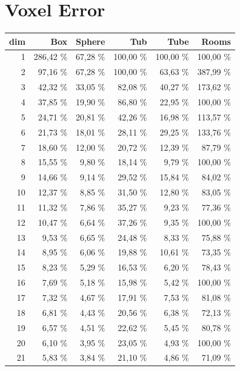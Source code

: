 \documentclass[11pt,twoside,a4paper]{report}
\begin{document}
\section{Voxel Error}
	{\footnotesize
    \begin{longtable}{rrrrrr}
    \toprule
    dim   & Box   & Sphere & Tub   & Tube  & Rooms \\
    \midrule
    1     & 286,42 \% & 67,28 \% & 100,00 \% & 100,00 \% & 100,00 \% \\
    2     & 97,16 \% & 67,28 \% & 100,00 \% & 63,63 \% & 387,99 \% \\
    3     & 42,32 \% & 33,05 \% & 82,08 \% & 40,27 \% & 173,62 \% \\
    4     & 37,85 \% & 19,90 \% & 86,80 \% & 22,95 \% & 100,00 \% \\
    5     & 24,71 \% & 20,81 \% & 42,26 \% & 16,98 \% & 113,57 \% \\
    6     & 21,73 \% & 18,01 \% & 28,11 \% & 29,25 \% & 133,76 \% \\
    7     & 18,60 \% & 12,00 \% & 20,72 \% & 12,39 \% & 87,79 \% \\
    8     & 15,55 \% & 9,80 \% & 18,14 \% & 9,79 \% & 100,00 \% \\
    9     & 14,66 \% & 9,14 \% & 29,52 \% & 15,84 \% & 84,02 \% \\
    10    & 12,37 \% & 8,85 \% & 31,50 \% & 12,80 \% & 83,05 \% \\
    11    & 11,32 \% & 7,86 \% & 35,27 \% & 9,23 \% & 77,36 \% \\
    12    & 10,47 \% & 6,64 \% & 37,26 \% & 9,35 \% & 100,00 \% \\
    13    & 9,53 \% & 6,65 \% & 24,48 \% & 8,33 \% & 75,88 \% \\
    14    & 8,95 \% & 6,06 \% & 19,88 \% & 10,61 \% & 73,35 \% \\
    15    & 8,23 \% & 5,29 \% & 16,53 \% & 6,20 \% & 78,43 \% \\
    16    & 7,69 \% & 5,18 \% & 15,98 \% & 5,42 \% & 100,00 \% \\
    17    & 7,32 \% & 4,67 \% & 17,91 \% & 7,53 \% & 81,08 \% \\
    18    & 6,81 \% & 4,43 \% & 20,56 \% & 6,38 \% & 72,13 \% \\
    19    & 6,57 \% & 4,51 \% & 22,62 \% & 5,45 \% & 80,78 \% \\
    20    & 6,10 \% & 3,95 \% & 23,05 \% & 4,93 \% & 100,00 \% \\
    21    & 5,83 \% & 3,84 \% & 21,10 \% & 4,86 \% & 71,09 \% \\

\end{longtable}}
\end{document}
